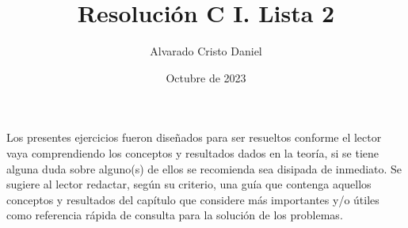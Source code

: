 \documentclass[12pt]{article}
\begin{document}
\title{Resolución C I. Lista 2}
\author{Alvarado Cristo Daniel}
\date{Octubre de 2023}
\maketitle

Los presentes ejercicios fueron diseñados para ser resueltos conforme el lector vaya comprendiendo los conceptos y resultados dados en la teoría, si se tiene alguna duda sobre alguno(s) de ellos se recomienda sea disipada de inmediato. Se sugiere al lector redactar, según su criterio, una guía que contenga aquellos conceptos y resultados del capítulo que considere más importantes y/o útiles como referencia
rápida de consulta para la solución de los problemas.

\renewcommand{\labelenumi}{\textbf{2.\theenumi.}}
\renewcommand{\labelenumii}{\textbf{\Roman{enumii}.}}
\providecommand{\abs}[1]{\left| #1 \right|}
\def\proof{\textit{Solución:}\\}
\end{document}
